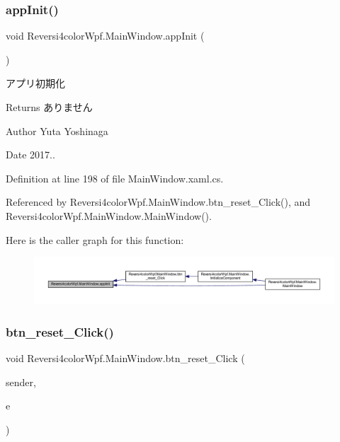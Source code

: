 \subsubsection{\texorpdfstring{app\+Init()}{appInit()}}
{\footnotesize\ttfamily void Reversi4color\+Wpf.\+Main\+Window.\+app\+Init (\begin{DoxyParamCaption}{ }\end{DoxyParamCaption})}



アプリ初期化 

\begin{DoxyReturn}{Returns}
ありません 
\end{DoxyReturn}
\begin{DoxyAuthor}{Author}
Yuta Yoshinaga 
\end{DoxyAuthor}
\begin{DoxyDate}{Date}
2017.. 
\end{DoxyDate}


Definition at line 198 of file Main\+Window.\+xaml.\+cs.



Referenced by Reversi4color\+Wpf.\+Main\+Window.\+btn\+\_\+reset\+\_\+\+Click(), and Reversi4color\+Wpf.\+Main\+Window.\+Main\+Window().

Here is the caller graph for this function\+:
\nopagebreak
\begin{figure}[H]
\begin{center}
\leavevmode
\includegraphics[width=350pt]{class_reversi4color_wpf_1_1_main_window_aba5f0e0ddcb0c9f436a2f9ee5916b47f_icgraph}
\end{center}
\end{figure}
\mbox{\label{class_reversi4color_wpf_1_1_main_window_a0ac7673de0ecfc247dd3224a9f999098}} 
\subsubsection{\texorpdfstring{btn\+\_\+reset\+\_\+\+Click()}{btn\_reset\_Click()}}
{\footnotesize\ttfamily void Reversi4color\+Wpf.\+Main\+Window.\+btn\+\_\+reset\+\_\+\+Click (\begin{DoxyParamCaption}\item[{object}]{sender,  }\item[{Routed\+Event\+Args}]{e }\end{DoxyParamCaption})\hspace{0.3cm}{\ttfamily [private]}}



